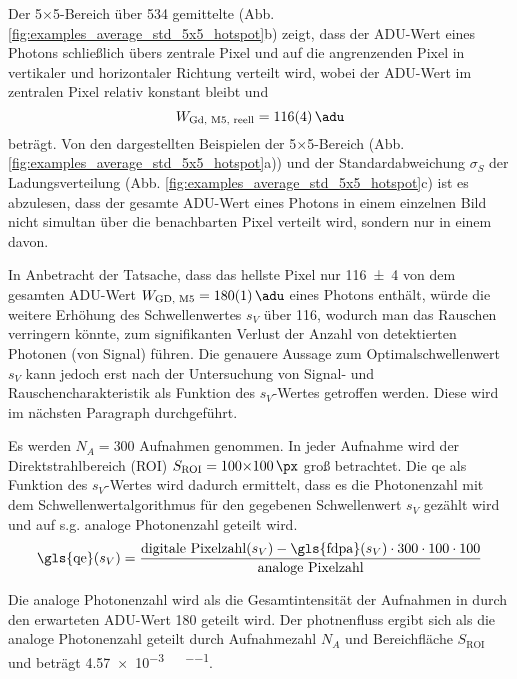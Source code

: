 \noindent
Der 5$\times$\SI{5}{\px}-Bereich über 534 gemittelte  (Abb. \ref{fig:examples_average_std_5x5_hotspot}b) zeigt, dass der ADU-Wert eines Photons schließlich übers zentrale Pixel und auf die angrenzenden Pixel in vertikaler und horizontaler Richtung verteilt wird, wobei der ADU-Wert im zentralen Pixel relativ konstant bleibt und 
\begin{equation}
    W_\text{Gd, M5, reell}  = \SI{116(4)}{\adu} 
\end{equation}
beträgt. Von den dargestellten Beispielen der 5$\times$\SI{5}{\px}-Bereich (Abb. \ref{fig:examples_average_std_5x5_hotspot}a)) und der Standardabweichung $\sigma_{S}$ der Ladungsverteilung (Abb. \ref{fig:examples_average_std_5x5_hotspot}c) ist es abzulesen, dass der gesamte ADU-Wert eines Photons in einem einzelnen Bild nicht simultan über die benachbarten Pixel verteilt wird, sondern nur in einem davon. 

\noindent
In Anbetracht der Tatsache, dass das hellste Pixel nur \SI{116(4)}{\adu} von dem gesamten ADU-Wert $W_\text{GD, M5} = \SI{180(1)}{\adu}$ eines Photons enthält, würde die weitere Erhöhung des Schwellenwertes $s_V$ über \SI{116}{\adu}, wodurch man das Rauschen verringern könnte, zum signifikanten Verlust der Anzahl von detektierten Photonen (von Signal) führen. Die genauere Aussage zum Optimalschwellenwert $s_V$ kann jedoch erst nach der Untersuchung von Signal- und Rauschencharakteristik als Funktion des $s_V$-Wertes getroffen werden. Diese wird im nächsten Paragraph durchgeführt. 

\noindent
Es werden $N_A = 300$ Aufnahmen genommen. In jeder Aufnahme wird der Direktstrahlbereich (ROI) $S_\text{ROI} = 100{\times}\SI{100}{\px}$ groß betrachtet. Die \gls{qe} als Funktion des $s_V$-Wertes wird dadurch ermittelt, dass es die Photonenzahl mit dem Schwellenwertalgorithmus für den gegebenen Schwellenwert $s_V$ gezählt wird und auf s.g. analoge Photonenzahl geteilt wird.
\begin{equation}
    \text{\gls{qe}}(s_V) =  \frac{\text{digitale Pixelzahl}(s_V) - \text{\gls{fdpa}}(s_V)\cdot 300\cdot100\cdot 100  }{\text{analoge Pixelzahl}}
\end{equation}



Die analoge Photonenzahl wird als die Gesamtintensität der Aufnahmen in \si{\adu} durch den erwarteten ADU-Wert \SI{180}{\adu} geteilt wird. Der \gls{photnenfluss} ergibt sich als die analoge Photonenzahl geteilt durch Aufnahmezahl $N_A$ und Bereichfläche $S_\text{ROI}$ und beträgt \SI{4.57e-3}{\photons\per\pixel\per\capture}.

